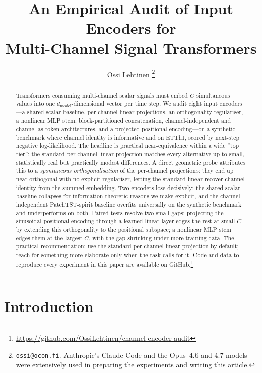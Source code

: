 \documentclass[11pt]{article}
\title{An Empirical Audit of Input Encoders for\\
       Multi-Channel Signal Transformers}
\author{Ossi Lehtinen%
  \thanks{\texttt{ossi@ocon.fi}.
    Anthropic's Claude Code and the Opus~4.6 and 4.7 models were
    extensively used in preparing the experiments and writing this
    article.}}
\affil{Ocon Oy}
\date{}
\begin{document}
\maketitle

\begin{abstract}
Transformers consuming multi-channel scalar signals must embed $C$
simultaneous values into one $d_{\text{model}}$-dimensional vector
per time step. We audit eight input encoders---a shared-scalar
baseline, per-channel linear projections, an orthogonality
regulariser, a nonlinear MLP stem, block-partitioned concatenation,
channel-independent and channel-as-token architectures, and a
projected positional encoding---on a synthetic benchmark where
channel identity is informative and on ETTh1, scored by next-step
negative log-likelihood. The headline is practical near-equivalence
within a wide ``top tier'': the standard per-channel linear
projection matches every alternative up to small, statistically
real but practically modest differences. A direct geometric probe
attributes this to a \emph{spontaneous orthogonalisation} of the
per-channel projections: they end up near-orthogonal with no
explicit regulariser, letting the standard linear recover channel
identity from the summed embedding. Two encoders lose decisively:
the shared-scalar baseline collapses for information-theoretic
reasons we make explicit, and the channel-independent
PatchTST-spirit baseline overfits universally on the synthetic
benchmark and underperforms on both. Paired tests resolve two
small gaps: projecting the sinusoidal positional encoding through
a learned linear layer edges the rest at small $C$ by extending
this orthogonality to the positional subspace; a nonlinear MLP
stem edges them at the largest $C$, with the gap shrinking under
more training data. The practical recommendation: use the standard
per-channel linear projection by default; reach for something
more elaborate only when the task calls for it. Code and data to reproduce every experiment in this
paper are available on GitHub.\footnote{\url{https://github.com/OssiLehtinen/channel-encoder-audit}}
\end{abstract}

\section{Introduction}
\end{document}
